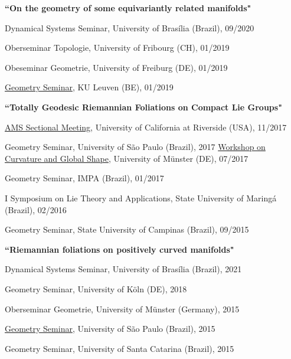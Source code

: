 \documentclass[10pt]{article}
\newenvironment{innerlist}[1][\enskip\textbullet]%
{\begin{compactitem}[#1]}{\end{compactitem}}
\newcommand{\blankline}{\quad\pagebreak[2]}
\begin{document}
	
	
	
	\blankline
	
	\textbf{``On the geometry of some equivariantly related manifolds"}
	\begin{innerlist}[-]
		\item  Dynamical Systems Seminar, University of Brasília (Brazil), 09/2020
		\item  Oberseminar Topologie, University of Fribourg (CH), 01/2019
		\item  Obeseminar Geometrie, University of Freiburg (DE), 01/2019
		\item  \href{https://wis.kuleuven.be/agenda/sem-geometry/academic-year-2018-2019/seminar_differential_geometry_Speranca}{Geometry Seminar}, KU Leuven (BE), 01/2019
	\end{innerlist}
	
	
	
	\blankline
	
	\textbf{``Totally Geodesic Riemannian Foliations on Compact Lie Groups"}
	\begin{innerlist}[-]
		\item  \href{https://www.ams.org/meetings/sectional/2243_program_ss21.html#title}{AMS Sectional Meeting}, University of California at Riverside (USA), 11/2017
		\item Geometry Seminar, University of São Paulo (Brazil), 2017 \href{https://ivv5hpp.uni-muenster.de/u/wilking/CGS_2017/abstracts.html#Speranca}{Workshop on Curvature and Global Shape}, University of M\"unster (DE), 07/2017
		\item  Geometry Seminar, IMPA (Brazil), 01/2017
		\item  I Symposium on Lie Theory and Applications, State University of Maringá (Brazil), 02/2016
		\item  Geometry Seminar, State University of Campinas (Brazil), 09/2015
	\end{innerlist}
	
	
	\blankline
	
	\textbf{``Riemannian foliations on positively curved manifolds"}
	\begin{innerlist}[-]
		\item  Dynamical Systems Seminar, University of Brasília (Brazil), 2021
		\item  Geometry Seminar, University of K\"oln (DE), 2018
		\item  Oberseminar Geometrie, University of M\"unster (Germany), 2015
		\item  \href{http://www.ime.usp.br/~geometry/GeometrySeminarnew.htm}{Geometry Seminar}, University of São Paulo (Brazil), 2015
		\item  Geometry Seminar, University of Santa Catarina (Brazil), 2015
	\end{innerlist}
	
\end{document}
